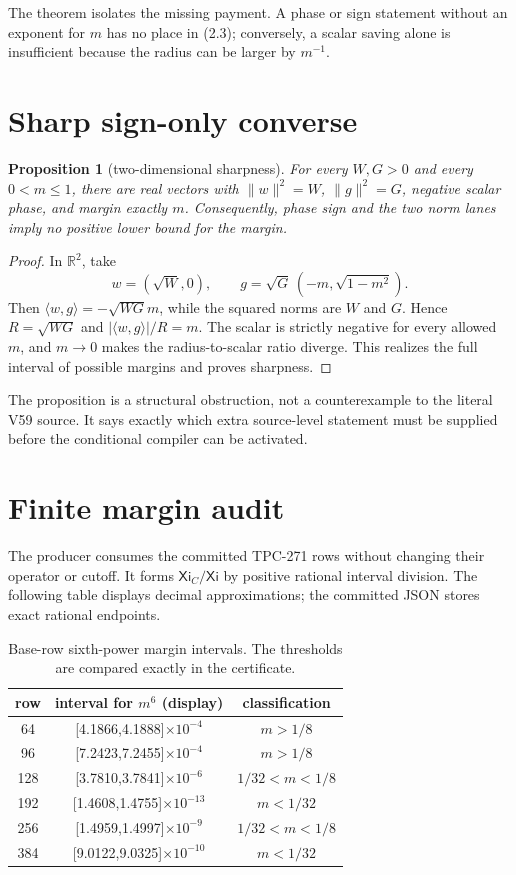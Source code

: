 \documentclass[11pt]{article}
\newcommand{\XiN}{\mathsf{Xi}}
\newcommand{\Xic}{\mathsf{Xi}_{C}}
\newcommand{\marg}{m}
\newtheorem{proposition}{Proposition}
\begin{document}
The theorem isolates the missing payment.  A phase or sign statement without
an exponent for \(\marg\) has no place in (2.3); conversely, a scalar saving
alone is insufficient because the radius can be larger by \(\marg^{-1}\).

\section{Sharp sign-only converse}

\begin{proposition}[two-dimensional sharpness]
For every \(W,G>0\) and every \(0<m\leq1\), there are real vectors with
\(\|w\|^2=W\), \(\|g\|^2=G\), negative scalar phase, and margin exactly
\(m\).  Consequently, phase sign and the two norm lanes imply no positive
lower bound for the margin.
\end{proposition}

\begin{proof}
In \(\mathbb R^2\), take
\[
 w=(\sqrt W,0),\qquad
 g=\sqrt G\,(-m,\sqrt{1-m^2}).
\]
Then \(\langle w,g\rangle=-\sqrt{WG}m\), while the squared norms are \(W\)
and \(G\).  Hence \(R=\sqrt{WG}\) and \(|\langle w,g\rangle|/R=m\).
The scalar is strictly negative for every allowed \(m\), and \(m\to0\)
makes the radius-to-scalar ratio diverge.  This realizes the full interval of
possible margins and proves sharpness.
\end{proof}

The proposition is a structural obstruction, not a counterexample to the
literal V59 source.  It says exactly which extra source-level statement must
be supplied before the conditional compiler can be activated.

\section{Finite margin audit}

The producer consumes the committed TPC-271 rows without changing their
operator or cutoff.  It forms \(\Xic/\XiN\) by positive rational interval
division.  The following table displays decimal approximations; the committed
JSON stores exact rational endpoints.

\begin{table}[h]
\centering
\scriptsize
\begin{tabular}{c c c}
\toprule
row & interval for \(m^6\) (display) & classification\\
\midrule
64 & [4.1866,4.1888]$\times10^{-4}$ & $m>1/8$\\
96 & [7.2423,7.2455]$\times10^{-4}$ & $m>1/8$\\
128 & [3.7810,3.7841]$\times10^{-6}$ & $1/32<m<1/8$\\
192 & [1.4608,1.4755]$\times10^{-13}$ & $m<1/32$\\
256 & [1.4959,1.4997]$\times10^{-9}$ & $1/32<m<1/8$\\
384 & [9.0122,9.0325]$\times10^{-10}$ & $m<1/32$\\
\bottomrule
\end{tabular}
\caption{Base-row sixth-power margin intervals.  The thresholds are compared
exactly in the certificate.}
\end{table}
\end{document}
